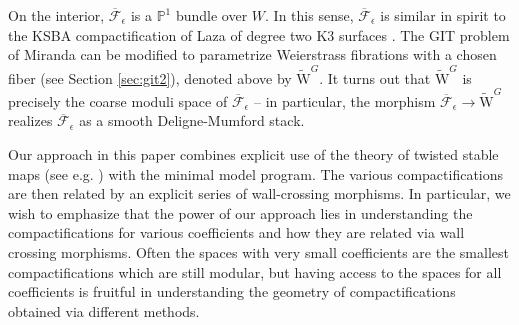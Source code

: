 \documentclass[11pt]{amsart}
\newtheorem{theorem}{Theorem}[section]
\theoremstyle{definition}
\newtheorem{remark}[theorem]{Remark}
\theoremstyle{remark}
\newcommand{\bP}{{\mathbb P}}
\newcommand{\oMG}{\overline{\mathrm{W}}^G}
\newcommand{\sbb}{\overline{\mathrm{W}}^{*}}
\newcommand{\fe}{\overline{\mathcal{F}}_\epsilon}
\newcommand{\km}{\fe}
\newcommand{\oMGd}{\widetilde{\mathrm{W}}^G}
\begin{document}
	On the interior, $\km$ is a $\bP^1$ bundle over $W$. In this sense, $\km$ is similar in spirit to the KSBA compactification of Laza of degree two K3 surfaces \cite{laza}. The GIT problem of Miranda can be modified  to parametrize Weierstrass fibrations with a chosen fiber (see Section \ref{sec:git2}), denoted above by $\oMGd$. It turns out that $\oMGd$ is precisely the coarse moduli space of $\km$ -- in particular, the morphism $\km \to \oMGd$ realizes $\km$ as a smooth Deligne-Mumford stack.
	
	
	Our approach in this paper combines explicit use of the theory of twisted stable maps (see e.g. \cite{tsm}) with the minimal model program. The various compactifications are then related by an explicit series of wall-crossing morphisms.  In particular, we wish to emphasize that the power of our approach lies in understanding the compactifications for various coefficients and how they are related via wall crossing morphisms.  Often the spaces with very small coefficients are the smallest compactifications which are still modular, but having access to the spaces for all coefficients is fruitful in understanding the geometry of compactifications obtained via different methods. 
	
	
	
	
	
	
	
	
	
	
	
	
	
	
	
	
	
\end{document}
